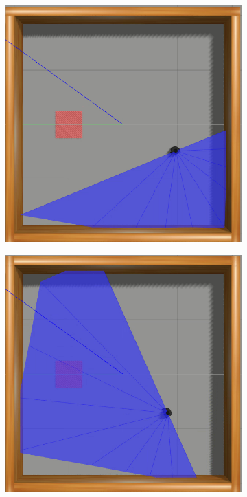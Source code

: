 \begin{figure}[htbp]
    \centering
    \begin{subfigure}[b]{0.115\textwidth}
        \includegraphics[width=\textwidth]{images/simenv1/1.png}
    \end{subfigure}
    \hfill
    \begin{subfigure}[b]{0.115\textwidth}
        \includegraphics[width=\textwidth]{images/simenv1/2.png}

\end{subfigure}
\end{figure}
